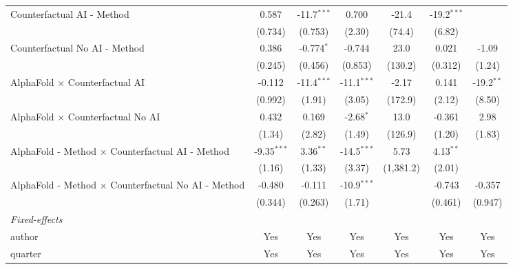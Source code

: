 \begin{tabular}{lcccccc}
   Counterfactual AI - Method                                 & 0.587         & -11.7$^{***}$ & 0.700         & -21.4     & -19.2$^{***}$ &   \\   
                                                              & (0.734)       & (0.753)       & (2.30)        & (74.4)    & (6.82)        &   \\   
   Counterfactual No AI - Method                              & 0.386         & -0.774$^{*}$  & -0.744        & 23.0      & 0.021         & -1.09\\   
                                                              & (0.245)       & (0.456)       & (0.853)       & (130.2)   & (0.312)       & (1.24)\\   
   AlphaFold $\times$ Counterfactual AI                       & -0.112        & -11.4$^{***}$ & -11.1$^{***}$ & -2.17     & 0.141         & -19.2$^{**}$\\   
                                                              & (0.992)       & (1.91)        & (3.05)        & (172.9)   & (2.12)        & (8.50)\\   
   AlphaFold $\times$ Counterfactual No AI                    & 0.432         & 0.169         & -2.68$^{*}$   & 13.0      & -0.361        & 2.98\\   
                                                              & (1.34)        & (2.82)        & (1.49)        & (126.9)   & (1.20)        & (1.83)\\   
   AlphaFold - Method $\times$ Counterfactual AI - Method     & -9.35$^{***}$ & 3.36$^{**}$   & -14.5$^{***}$ & 5.73      & 4.13$^{**}$   &   \\   
                                                              & (1.16)        & (1.33)        & (3.37)        & (1,381.2) & (2.01)        &   \\   
   AlphaFold - Method $\times$ Counterfactual No AI - Method  & -0.480        & -0.111        & -10.9$^{***}$ &           & -0.743        & -0.357\\   
                                                              & (0.344)       & (0.263)       & (1.71)        &           & (0.461)       & (0.947)\\   
   \midrule
   \emph{Fixed-effects}\\
   author                                                     & Yes           & Yes           & Yes           & Yes       & Yes           & Yes\\  
   quarter                                                    & Yes           & Yes           & Yes           & Yes       & Yes           & Yes\\  

\end{tabular}
